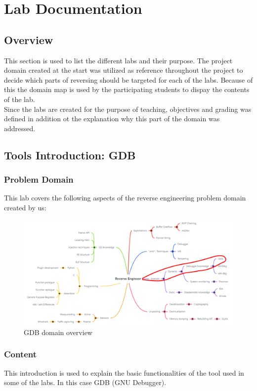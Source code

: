 \section{Lab Documentation}
\subsection{Overview}
This section is used to list the different labs and their purpose. The project domain created at the start was utilized as reference throughout the project to decide which parts of reversing should be targeted for each of the labs. Because of this the domain map is used by the participating students to dispay the contents of the lab. \\ 
Since the labs are created for the purpose of teaching, objectives and grading was defined in addition ot the explanation why this part of the domain was addressed.
\subsection{Tools Introduction: GDB}
\subsubsection*{Problem Domain}
This lab covers the following aspects of the reverse engineering problem domain created by us:
\vspace{-2ex}
\begin{figure}[H]
    \includegraphics[width=\textwidth]{resources/GDBIntro-overview-light.png}
    \caption{GDB domain overview}
    \label{fig:gdb-overview}
\end{figure}
\subsubsection*{Content}
This introduction is used to explain the basic functionalities of the tool used in some of the labs. In this case GDB (GNU Debugger).
\newpage

